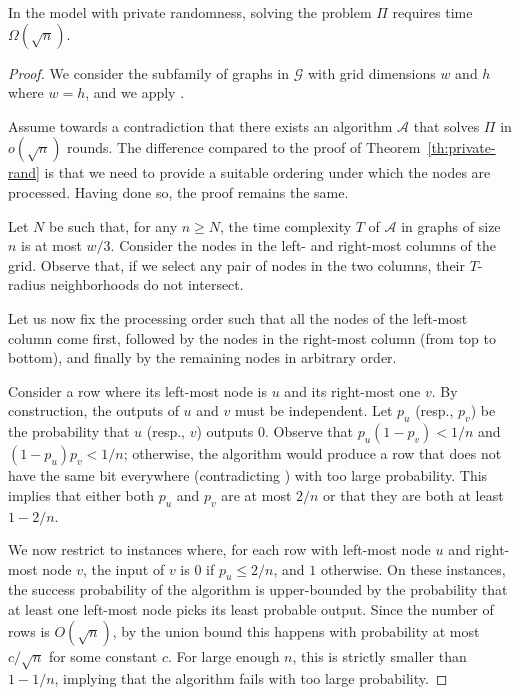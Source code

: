 \documentclass[11pt]{article}
\begin{document}
\begin{theorem}\label{thm:lb-slocal}
	In the \slocal model with private randomness, solving the problem $\Pi$
	requires time $\Omega(\sqrt{n})$.
\end{theorem}
\begin{proof}
We consider the subfamily of graphs in $\mathcal{G}$ with grid dimensions $w$
and $h$ where $w = h$, and we apply . 

	Assume towards a contradiction that there exists an algorithm $\mathcal{A}$
	that solves $\Pi$ in $o(\sqrt{n})$ rounds. The difference compared to the
	proof of Theorem~\ref{th:private-rand} is that we need to provide a suitable
	ordering under which the nodes are processed. Having done so, the proof
	remains the same.

	Let $N$ be such that, for any $n\ge N$, the time complexity $T$ of
	$\mathcal{A}$ in graphs of size $n$ is at most $w/3$. Consider the nodes
	in the left- and right-most columns of the grid. Observe that, if we select
	any pair of nodes in the two columns, their $T$-radius neighborhoods do not intersect.

	Let us now fix the processing order such that all the nodes of the left-most
	column come first, followed by the nodes in the right-most column (from top to
	bottom), and finally by the remaining nodes in arbitrary order.

	Consider a row where its left-most node is $u$ and its right-most one $v$. By
	construction, the outputs of $u$ and $v$ must be independent. 
	Let $p_u$ (resp., $p_v$) be the probability that $u$ (resp., $v$) outputs $0$.
	Observe that $p_u (1 - p_v) < 1/n$ and $(1- p_u)p_v < 1/n$; otherwise, the
	algorithm would produce a row that does not have the same bit everywhere
	(contradicting ) with too large probability. This
	implies that either both $p_u$ and $p_v$ are at most $2/n$ or that they are
	both at least $1 - 2/n$.
	
	We now restrict to instances where, for each row with left-most node $u$ and
	right-most node $v$, the input of $v$ is $0$ if $p_u \le 2/n$, and $1$
	otherwise. On these instances, the success probability of the algorithm is
	upper-bounded by the probability that at least one left-most node picks its
	least probable output. Since the number of rows is $O(\sqrt{n})$, by the union
	bound this happens with probability at most $c / \sqrt{n}$ for some constant
	$c$. 
	For large enough $n$, this is strictly smaller than $1 - 1/n$, implying that
	the algorithm fails with too large probability.
\end{proof}
\end{document}
